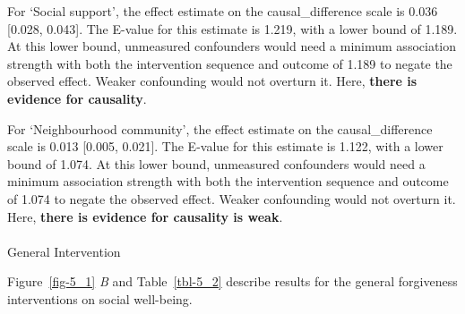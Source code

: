 \documentclass[
  single column]{article}
\makeatletter
\let\oldparagraph\paragraph
\renewcommand{\paragraph}{
    \@ifstar
      \xxxParagraphStar
      \xxxParagraphNoStar
  }
\newcommand{\xxxParagraphStar}[1]{\oldparagraph*{#1}\mbox{}}
\newcommand{\xxxParagraphNoStar}[1]{\oldparagraph{#1}\mbox{}}
\makeatother
\begin{document}
For `Social support', the effect estimate on the causal\_difference
scale is 0.036 {[}0.028, 0.043{]}. The E-value for this estimate is
1.219, with a lower bound of 1.189. At this lower bound, unmeasured
confounders would need a minimum association strength with both the
intervention sequence and outcome of 1.189 to negate the observed
effect. Weaker confounding would not overturn it. Here, \textbf{there is
evidence for causality}.

For `Neighbourhood community', the effect estimate on the
causal\_difference scale is 0.013 {[}0.005, 0.021{]}. The E-value for
this estimate is 1.122, with a lower bound of 1.074. At this lower
bound, unmeasured confounders would need a minimum association strength
with both the intervention sequence and outcome of 1.074 to negate the
observed effect. Weaker confounding would not overturn it. Here,
\textbf{there is evidence for causality is weak}.

\paragraph{General Intervention}\label{general-intervention-4}

Figure~\ref{fig-5_1} \emph{B} and Table~\ref{tbl-5_2} describe results
for the general forgiveness interventions on social well-being.
\end{document}
